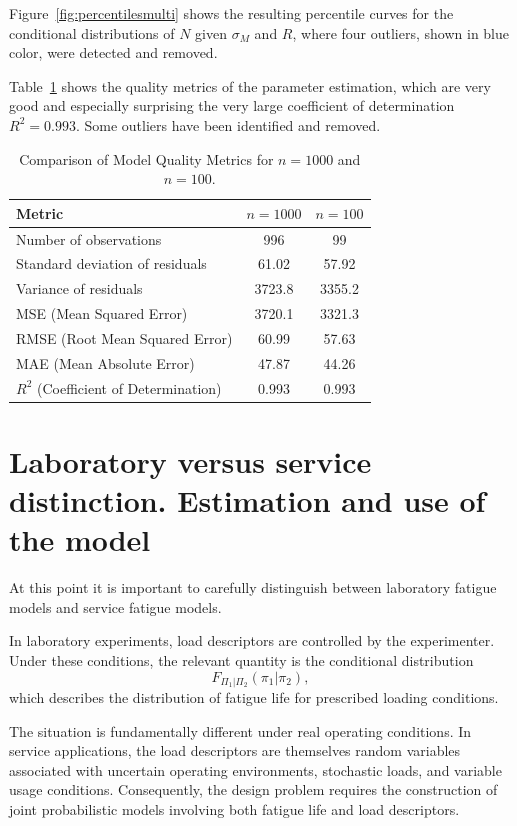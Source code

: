 Figure~\ref{fig:percentilesmulti} shows the resulting percentile curves for the conditional distributions of $N$ given $\sigma_M$ and $R$, where four outliers, shown in blue color, were detected and removed.

Table~\ref{tab:qualitymetrics} shows the quality metrics of the parameter estimation, which are very good and especially surprising the very large coefficient of determination $R^2 = 0.993$. Some outliers have been identified and removed.

\begin{table}[htpb]
\centering
\caption{Comparison of Model Quality Metrics for $n = 1000$ and $n = 100$.}
\label{tab:qualitymetrics}
\begin{tabular}{lcc}
\toprule
Metric & $n = 1000$ & $n = 100$ \\
\midrule
Number of observations & 996 & 99 \\
Standard deviation of residuals & 61.02 & 57.92 \\
Variance of residuals & 3723.8 & 3355.2 \\
MSE (Mean Squared Error) & 3720.1 & 3321.3 \\
RMSE (Root Mean Squared Error) & 60.99 & 57.63 \\
MAE (Mean Absolute Error) & 47.87 & 44.26 \\
$R^2$ (Coefficient of Determination) & 0.993 & 0.993 \\
\bottomrule
\end{tabular}
\end{table}


\section{Laboratory versus service distinction. Estimation and use of the model}
\label{sec:lab-vs-service}

At this point it is important to carefully distinguish between laboratory fatigue models and service fatigue models.

In laboratory experiments, load descriptors are controlled by the experimenter. Under these conditions, the relevant quantity is the conditional distribution
\[
F_{\Pi_1|\Pi_2}(\pi_1|\pi_2),
\]
which describes the distribution of fatigue life for prescribed loading conditions.

The situation is fundamentally different under real operating conditions. In service applications, the load descriptors are themselves random variables associated with uncertain operating environments, stochastic loads, and variable usage conditions. Consequently, the design problem requires the construction of joint probabilistic models involving both fatigue life and load descriptors.

